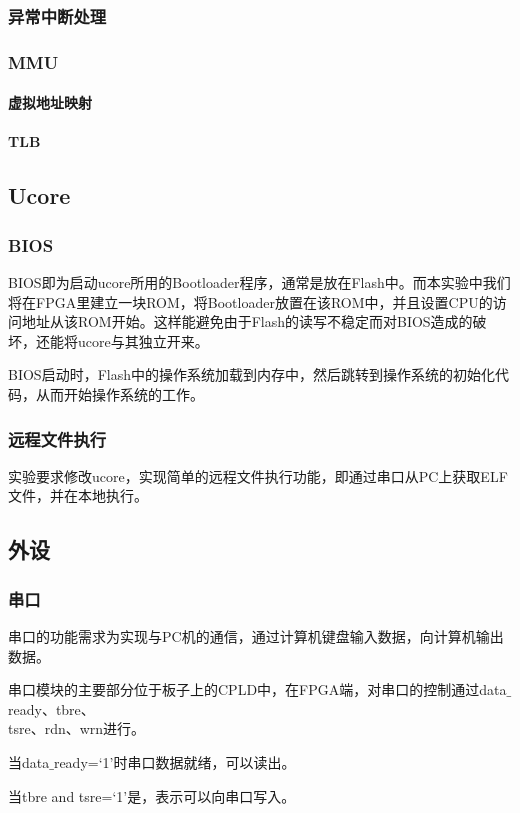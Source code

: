 \subsubsection{异常中断处理}
\subsubsection{MMU}
\paragraph{虚拟地址映射}
\paragraph{TLB}

\subsection{Ucore}
\subsubsection{BIOS}
BIOS即为启动ucore所用的Bootloader程序，通常是放在Flash中。而本实验中我们将在FPGA里建立一块ROM，将Bootloader放置在该ROM中，并且设置CPU的访问地址从该ROM开始。这样能避免由于Flash的读写不稳定而对BIOS造成的破坏，还能将ucore与其独立开来。

BIOS启动时，Flash中的操作系统加载到内存中，然后跳转到操作系统的初始化代码，从而开始操作系统的工作。
\subsubsection{远程文件执行}
实验要求修改ucore，实现简单的远程文件执行功能，即通过串口从PC上获取ELF文件，并在本地执行。
\subsection{外设}
\subsubsection{串口}
串口的功能需求为实现与PC机的通信，通过计算机键盘输入数据，向计算机输出数据。

串口模块的主要部分位于板子上的CPLD中，在FPGA端，对串口的控制通过data$\_$ready、tbre、\\
tsre、rdn、wrn进行。

当data$\_$ready=‘1’时串口数据就绪，可以读出。

当tbre and tsre=‘1’是，表示可以向串口写入。

